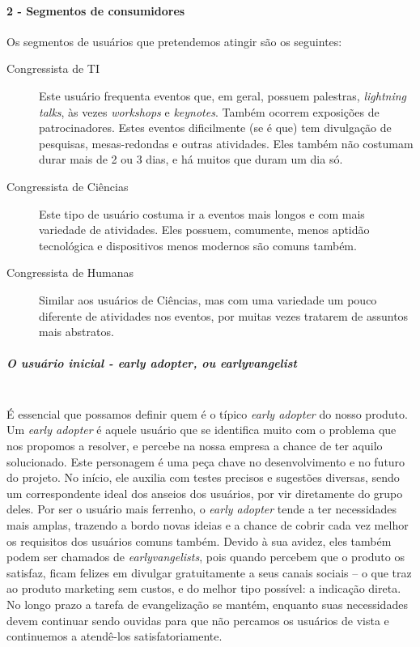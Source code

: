 \documentclass[12pt,a4paper,twoside,hyphens,english,brazil]{abntex2}
\newcommand{\hip}{{\color{BlueViolet}\framebox[1.1\width]{HIP}}}
\begin{document}
\paragraph*{2 - Segmentos de consumidores}
Os segmentos de usuários que pretendemos atingir são os seguintes:
\begin{description}
	\item[\hip{} Congressista de TI] Este usuário frequenta eventos que, em geral, possuem palestras, \emph{lightning talks}, às vezes \emph{workshops} e \emph{keynotes}. Também ocorrem exposições de patrocinadores. Estes eventos dificilmente (se é que) tem divulgação de pesquisas, mesas-redondas e outras atividades. Eles também não costumam durar mais de 2 ou 3 dias, e há muitos que duram um dia só.

	\item[\hip{} Congressista de Ciências] Este tipo de usuário costuma ir a eventos mais longos e com mais variedade de atividades. Eles possuem, comumente, menos aptidão tecnológica e dispositivos menos modernos são comuns também.

	\item[\hip{} Congressista de Humanas] Similar aos usuários de Ciências, mas com uma variedade um pouco diferente de atividades nos eventos, por muitas vezes tratarem de assuntos mais abstratos.
\end{description}

\subparagraph*{O usuário inicial - \emph{early adopter}, ou \emph{earlyvangelist}} ~\\
É essencial que possamos definir quem é o típico \emph{early adopter} do nosso produto. Um \emph{early adopter} é aquele usuário que se identifica muito com o problema que nos propomos a resolver, e percebe na nossa empresa a chance de ter aquilo solucionado. Este personagem é uma peça chave no desenvolvimento e no futuro do projeto. No início, ele auxilia com testes precisos e sugestões diversas, sendo um correspondente ideal dos anseios dos usuários, por vir diretamente do grupo deles. Por ser o usuário mais ferrenho, o \emph{early adopter} tende a ter necessidades mais amplas, trazendo a bordo novas ideias e a chance de cobrir cada vez melhor os requisitos dos usuários comuns também. Devido à sua avidez, eles também podem ser chamados de \emph{earlyvangelists}, pois quando percebem que o produto os satisfaz, ficam felizes em divulgar gratuitamente a seus canais sociais -- o que traz ao produto marketing sem custos, e do melhor tipo possível: a indicação direta. No longo prazo a tarefa de evangelização se mantém, enquanto suas necessidades devem continuar sendo ouvidas para que não percamos os usuários de vista e continuemos a atendê-los satisfatoriamente.
\end{document}
